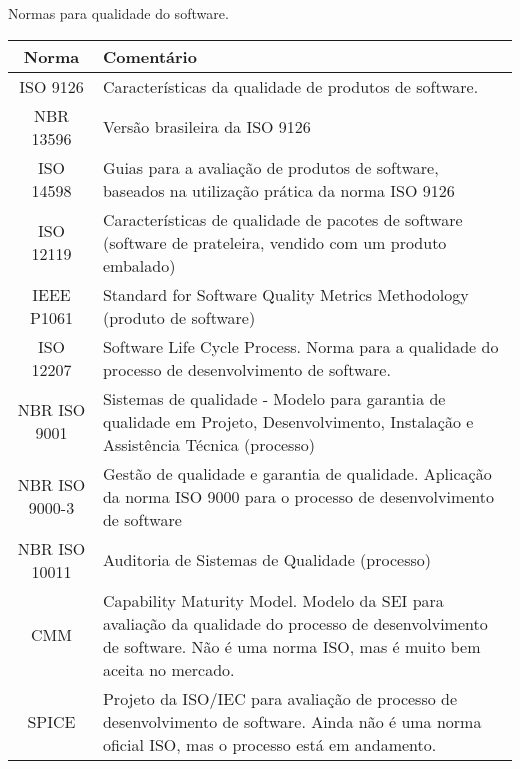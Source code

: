 \begin{quadro}[htb]
    \begin{center}
        
   
    \caption[Normas para qualidade do software]{Normas para qualidade do software.\label{quad:NormasSoftware}}
\begin{tabular}{|cp{11cm}|}
	\hline
	\textbf{Norma} & \textbf{Comentário} \\ \hline
	ISO 9126 & Características da qualidade de produtos de software.   \\ \hline
	
	NBR 13596 & Versão brasileira da ISO 9126    \\ \hline
	
	ISO 14598 & Guias para a 
            avaliação de produtos de software, 
            baseados na utilização prática da norma ISO 9126    \\ \hline
	
	ISO 12119 & Características de qualidade de pacotes de software (software de
prateleira, vendido com um produto embalado)    \\ \hline
	
	IEEE P1061 & Standard for Software Quality Metrics Methodology (produto de
software)   \\ \hline
	
	ISO 12207 & Software Life Cycle Process. Norma para a qualidade do processo de desenvolvimento de software.    \\ \hline
	
	NBR ISO 9001  & Sistemas de qualidade - Modelo para garantia de qualidade em Projeto,
Desenvolvimento, Instalação e Assistência Técnica (processo)    \\ \hline
	
	NBR ISO 9000-3 & Gestão de qualidade e garantia de qualidade. Aplicação da norma ISO
9000 para o processo de desenvolvimento de software    \\ \hline
	
	NBR ISO 10011 & Auditoria de Sistemas de Qualidade (processo)    \\ \hline
	
	CMM & Capability Maturity Model. Modelo da SEI para avaliação da
qualidade do processo de desenvolvimento de software. Não é uma
norma ISO, mas é muito bem aceita no mercado.    \\ \hline
	
	SPICE & Projeto da ISO/IEC para avaliação de processo de desenvolvimento de
software. Ainda não é uma norma oficial ISO, mas o processo está em
andamento.   \\ \hline
	
	 
\end{tabular}
	\end{center}
	\vspace*{-0,8cm}

	{\raggedright {}}
	
\end{quadro}
